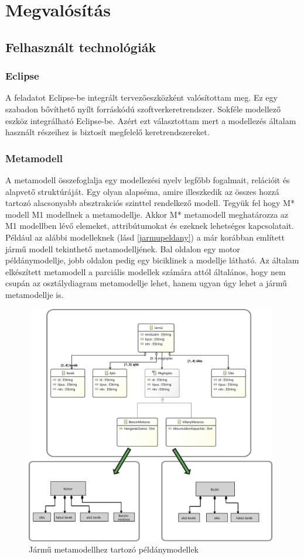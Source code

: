 \chapter{Megvalósítás}\label{chapter:realization}
\section{Felhasznált technológiák}
\subsection{Eclipse}
A feladatot Eclipse-be \cite{Eclipse} integrált tervezőeszközként valósítottam meg. Ez egy szabadon bővíthető nyílt forráskódú szoftverkeretrendszer. Sokféle modellező eszköz integrálható  Eclipse-be. Azért ezt választottam mert a modellezés általam használt részeihez is biztosít megfelelő keretrendszereket.
\subsection{Metamodell}
A metamodell összefoglalja egy modellezési nyelv legfőbb fogalmait, relációit és alapvető struktúráját. Egy olyan alapséma, amire illeszkedik az összes hozzá tartozó alacsonyabb absztrakciós szinttel rendelkező modell. 
Tegyük fel hogy M* modell M1 modellnek a metamodellje.
Akkor M* metamodell meghatározza az M1 modellben lévő elemeket, attribútumokat és ezeknek lehetséges kapcsolatait. Például az alábbi modelleknek (lásd \autoref{jarmupeldany}) a már korábban említett jármű modell tekinthető metamodelljének. Bal oldalon egy motor példánymodellje, jobb oldalon pedig egy biciklinek a modellje látható. Az általam elkészített metamodell a parciális modellek számára attól általános, hogy nem csupán az osztálydiagram metamodellje lehet, hanem ugyan úgy lehet a jármű metamodellje is. 

\begin{figure}[!ht]
	\centering
	\includegraphics[width=110mm]{figures/meta.pdf}
	\caption{Jármű metamodellhez tartozó példánymodellek} 
	\label{jarmupeldany}
\end{figure}

